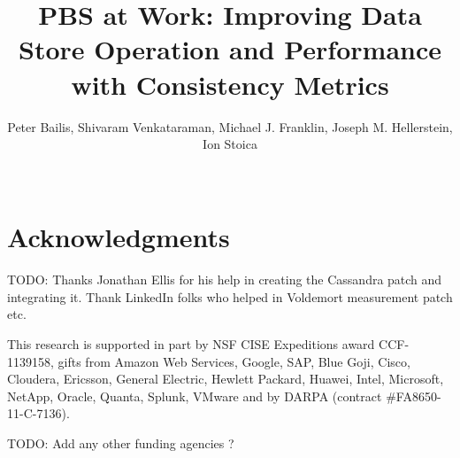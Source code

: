 \documentclass{sig-alternate}
\begin{document}
\title{PBS at Work: Improving Data Store Operation and Performance
  with Consistency Metrics}

\author{Peter Bailis, Shivaram Venkataraman, Michael J. Franklin, Joseph M. Hellerstein, Ion Stoica\\
\\
}


\maketitle







\section{Acknowledgments}
TODO: Thanks Jonathan Ellis for his help in creating the Cassandra patch and
integrating it. Thank LinkedIn folks who helped in Voldemort measurement patch
etc.

This research is supported in part by NSF CISE Expeditions award CCF-1139158,
gifts from Amazon Web Services, Google, SAP,  Blue Goji, Cisco, Cloudera,
Ericsson, General Electric, Hewlett Packard, Huawei, Intel, Microsoft, NetApp,
Oracle, Quanta, Splunk, VMware and by DARPA (contract \#FA8650-11-C-7136).

TODO: Add any other funding agencies ?



\end{document}
